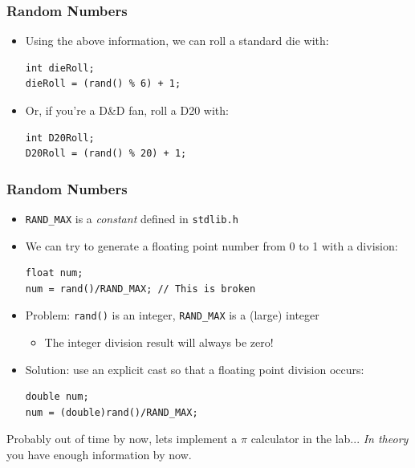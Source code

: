 \documentclass[14pt]{beamer}
\begin{document}
\begin{frame}[fragile]
\frametitle{Random Numbers}
\begin{itemize}
\item Using the above information, we can roll a standard die with:
\begin{lstlisting}[style=CStyle]
int dieRoll;
dieRoll = (rand() % 6) + 1;
\end{lstlisting}
\item Or, if you're a D\&D fan, roll a D20 with:
\begin{lstlisting}[style=CStyle]
int D20Roll;
D20Roll = (rand() % 20) + 1;
\end{lstlisting}
\end{itemize}
\end{frame}


\begin{frame}[fragile]
\frametitle{Random Numbers}
\begin{itemize}
\item \texttt{RAND\_MAX} is a \textit{constant} defined in \texttt{stdlib.h}
\item We can try to generate a floating point number from 0 to 1 with a division:
\begin{lstlisting}[style=CStyle]
float num;
num = rand()/RAND_MAX; // This is broken
\end{lstlisting}
\item Problem: \texttt{rand()} is an integer, \texttt{RAND\_MAX} is a (large) integer
	\begin{itemize}
		\item The integer division result will always be zero!
	\end{itemize}
\item Solution: use an explicit cast so that a floating point division occurs:
\begin{lstlisting}[style=CStyle]
double num;
num = (double)rand()/RAND_MAX;
\end{lstlisting}
\end{itemize}
\end{frame}

\begin{frame}
Probably out of time by now, lets implement a $\pi$ calculator in the lab... \textit{In theory} you have enough information by now.
\end{frame}
\end{document}
